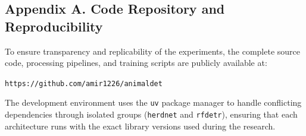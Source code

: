 \clearpage
{}

\subsection*{Appendix A. Code Repository and Reproducibility}

To ensure transparency and replicability of the experiments, the complete source code, processing pipelines, and training scripts are publicly available at:

\begin{center}
    \texttt{https://github.com/amir1226/animaldet}
\end{center}

The development environment uses the \texttt{uv} package manager to handle conflicting dependencies through isolated groups (\texttt{herdnet} and \texttt{rfdetr}), ensuring that each architecture runs with the exact library versions used during the research.

